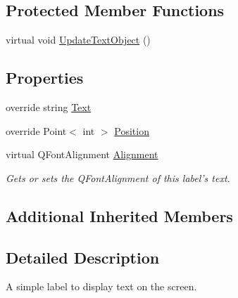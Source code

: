 \subsection*{Protected Member Functions}
\begin{DoxyCompactItemize}
\item 
virtual void \hyperlink{class_tri_devs_1_1_tri_engine_1_1_u_i_1_1_label_a277ac4160721c5de95cb16c39954e2d6}{Update\-Text\-Object} ()
\end{DoxyCompactItemize}
\subsection*{Properties}
\begin{DoxyCompactItemize}
\item 
override string \hyperlink{class_tri_devs_1_1_tri_engine_1_1_u_i_1_1_label_a3688a2efb2860794c6c29360f49cb4f1}{Text}
\item 
override Point$<$ int $>$ \hyperlink{class_tri_devs_1_1_tri_engine_1_1_u_i_1_1_label_af28958c2a190e348f03ee82431f072a3}{Position}
\item 
virtual Q\-Font\-Alignment \hyperlink{class_tri_devs_1_1_tri_engine_1_1_u_i_1_1_label_a8af3481e918b18747c57ec1502190897}{Alignment}
\begin{DoxyCompactList}\small\item\em Gets or sets the Q\-Font\-Alignment of this label's text. \end{DoxyCompactList}\end{DoxyCompactItemize}
\subsection*{Additional Inherited Members}


\subsection{Detailed Description}
A simple label to display text on the screen. 



